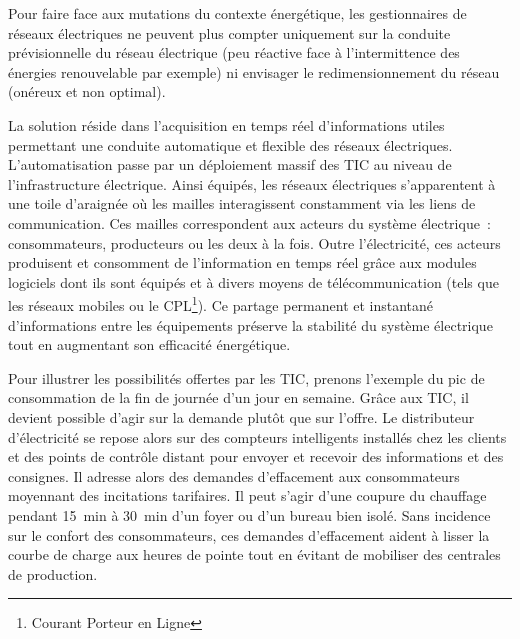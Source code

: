 Pour faire face aux mutations du contexte énergétique, les gestionnaires de 
réseaux électriques ne peuvent plus compter uniquement sur la conduite 
prévisionnelle du réseau électrique (peu réactive face à l'intermittence des énergies renouvelable par exemple) ni envisager le redimensionnement du réseau (onéreux et non optimal). 

La solution réside dans l'acquisition en temps réel d'informations utiles 
permettant une conduite automatique et flexible des réseaux électriques. 
L'automatisation passe par un déploiement massif des TIC au niveau de 
l'infrastructure électrique. Ainsi équipés, les réseaux électriques 
s'apparentent à une toile d'araignée où les mailles interagissent 
constamment via les liens de communication. Ces mailles correspondent aux 
acteurs du système électrique~: consommateurs, producteurs ou les deux à la fois. Outre l'électricité, ces acteurs produisent et consomment de l'information en 
temps réel grâce aux modules logiciels dont ils sont équipés et à divers moyens 
de 
télécommunication (tels que les réseaux mobiles ou le CPL\footnote{Courant Porteur en Ligne}). Ce partage permanent et instantané d'informations entre les équipements préserve la stabilité du système électrique tout en augmentant son efficacité énergétique. 

Pour illustrer les possibilités offertes par les TIC, prenons l'exemple du pic de consommation de la fin de journée d'un jour en semaine. Grâce aux TIC, il devient possible d'agir sur la demande plutôt que sur l'offre. Le distributeur d'électricité se repose alors sur des compteurs intelligents installés chez les clients et des points de contrôle distant pour envoyer et recevoir des informations et des consignes. Il adresse alors des demandes d'effacement aux consommateurs moyennant des incitations tarifaires. Il peut s'agir d'une coupure du chauffage pendant 15~min à 30~min d'un foyer ou d'un bureau bien isolé. Sans incidence sur le confort des consommateurs, ces demandes d'effacement aident à lisser la courbe de charge aux heures de pointe tout en évitant de mobiliser des centrales de production. 

